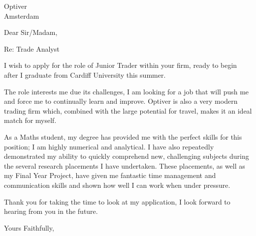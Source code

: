 \documentclass[12pt]{letter}
\begin{document}
\begin{letter}
{Optiver \\ Amsterdam}
\opening{Dear Sir/Madam,}

Re: Trade Analyst

I wish to apply for the role of Junior Trader within your firm, ready to begin after I graduate from Cardiff University this summer.

The role interests me due its challenges, I am looking for a job that will push me and force me to continually learn and improve.
Optiver is also a very modern trading firm which, combined with the large potential for travel, makes it an ideal match for myself.

As a Maths student, my degree has provided me with the perfect skills for this position; I am highly numerical and analytical.
I have also repeatedly demonstrated my ability to quickly comprehend new, challenging subjects during the several research placements I have undertaken.
These placements, as well as my Final Year Project, have given me fantastic time management and communication skills and shown how well I can work when under pressure.

Thank you for taking the time to look at my application, I look forward to hearing from you in the future.

\closing{Yours Faithfully,}


\end{letter}
\end{document}
